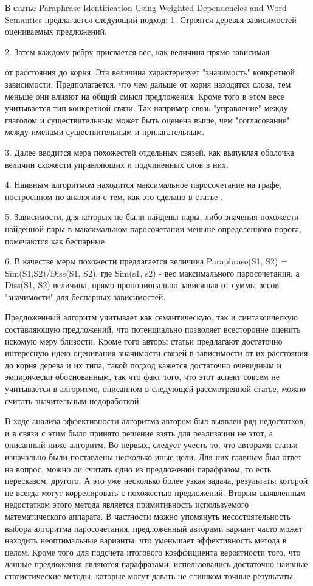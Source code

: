 В статье Paraphrase Identification Using Weighted Dependencies and Word Semantics\cite{weightedDep}
предлагается следующий подход:
1. Строятся деревья зависимостей оцениваемых предложений.

2. Затем каждому ребру присвается вес, как величина прямо зависимая

от расстояния до корня. Эта величина характеризует "значимость" конкретной зависимости.
Предполагается, что чем дальше от корня находятся слова, тем меньше они влияют
на общий смысл предложения. Кроме того в этом весе учитывается тип конкретной связи.
Так например связь-"управление" между глаголом и существительным
может быть оценена выше, чем "согласование" между именами существительным и прилагательным.

3. Далее вводится мера похожестей отдельных связей, как выпуклая оболочка 
величин схожести управляющих и подчиненных слов в них.

4. Наивным алгоритмом находится максимальное паросочетание на графе,
построенном по аналогии с тем, как это сделано в статье \cite{wordnetSim}.

5. Зависимости, для которых не были найдены пары, либо значения похожести
найденной пары в максимальном паросочетании меньше определенного порога,
помечаются как беспарные.

6. В качестве меры похожести предлагается величина 
Paraphrase(S1, S2) = Sim(S1,S2)/Diss(S1, S2), 
где Sim(s1, s2) - вес максимального паросочетания,
а Diss(S1, S2) величина, прямо пропоционально зависящая от 
суммы весов "значимости" для беспарных зависимостей.

Предложенный алгоритм учитывает как семантическую, так и синтаксическую составляющую
предложений, что потенциально позволяет всесторонне оценить искомую меру близости.
Кроме того авторы статьи предлагают достаточно интересную идею оценивания значимости связей
в зависимости от их расстояния до корня дерева и  их типа, такой подход кажется достаточно очевидным
и эмпирически обоснованным, так что факт того, что этот аспект совсем не учитывается в алгоритме,
описанном в следующей рассмотренной статье, можно считать значительным недоработкой.

В ходе анализа эффективности алгоритма автором был выявлен ряд недостатков,
и в связи с этим было принято решение взять для реализации не этот, а описанный ниже алгоритм.
Во-первых, следует учесть то, что авторами статьи изначально были поставлены несколько иные
цели. Для них главным был ответ на вопрос, можно ли считать одно из предложений парафразом,
то есть пересказом, другого. А это уже несколько более узкая задача,
результаты которой не всегда могут коррелировать с похожестью предложений.
Вторым выявленным недостатком этого метода является примитивность
используемого математического аппарата. В частности можно
упомянуть несостоятельность выбора алгоритма паросочетания, 
предложенный авторами вариант часто может находить неоптимальные варианты,
что уменьшает эффективность метода в целом. Кроме того для
подсчета итогового коэффициента вероятности того, что данные предложения
являются парафразами, использовались достаточно наивные статистические методы,
которые могут давать не слишком точные результаты.

